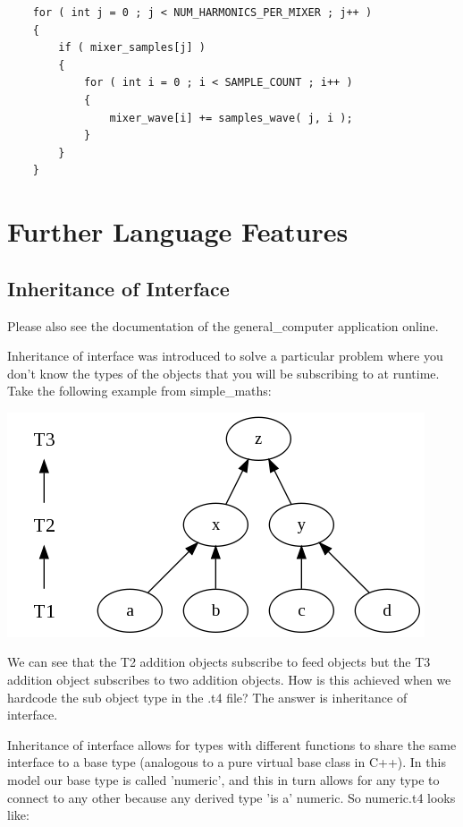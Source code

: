 \documentclass{report}
\begin{document}
\begin{verbatim}
    for ( int j = 0 ; j < NUM_HARMONICS_PER_MIXER ; j++ )
    {
        if ( mixer_samples[j] )
        {
            for ( int i = 0 ; i < SAMPLE_COUNT ; i++ )
            {
                mixer_wave[i] += samples_wave( j, i );
            }
        }
    }
\end{verbatim}

\chapter{Further Language Features}

\section{Inheritance of Interface}

Please also see the documentation of the general_computer application online.

Inheritance of interface was introduced to solve a particular problem where you don't know the types of the objects that you will be subscribing to at run­time. Take the following example from simple_maths:

\includegraphics[scale=0.5]{generalcomputerconcretesimple1.png}

We can see that the T2 addition objects subscribe to feed objects but the T3 addition object subscribes to two addition objects. How is this achieved when we hard­code the sub object type in the .t4 file? The answer is inheritance of interface.

Inheritance of interface allows for types with different functions to share the same interface to a base type (analogous to a pure virtual base class in C++). In this model our base type is called 'numeric', and this in turn allows for any type to connect to any other because any derived type 'is a' numeric. So numeric.t4 looks like:
\end{document}
